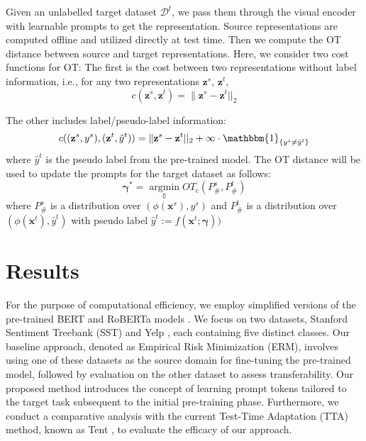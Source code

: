 \documentclass[11pt,a4paper]{article}
\begin{document}
Given an unlabelled target dataset $\mathcal{D}^t$, we pass them through the visual encoder with learnable prompts to get the representation. 
Source representations are computed offline and utilized directly at test time. 
Then we compute the OT distance between source and target representations. 
Here, we consider two cost functions for OT: The first is the cost between two representations without label information, i.e., for any two representations $\mathbf{z}^s$, $\mathbf{z}^t$, 
\begin{equation}
    c(\mathbf{z}^s, \mathbf{z}^t) = \|\mathbf{z}^s- \mathbf{z}^t||_2
\end{equation}

The other includes label/pseudo-label information:
\begin{equation}
    c((\mathbf{z}^s, y^s), (\mathbf{z}^t, \hat y^t)) = \|\mathbf{z}^s- \mathbf{z}^t||_2 + \infty \cdot \mathbbm{1}_{\{y^s \neq \hat y^t\}}
\end{equation}
where $\hat y^t$ is the pseudo label from the pre-trained model.
The OT distance will be used to update the prompts for the target dataset as follows:
\begin{equation}
\label{eq:ot-vp}
    \mathbf{\gamma}^* = \mathop{\arg \min}\limits_{\mathbb{\gamma}} OT_c(P^s_\#, P^t_\#)
\end{equation}
where $P^s_\#$ is a distribution over $(\phi(\mathbf{x}^s), y^s)$ and $P^t_\#$ is a distribution over $(\phi(\mathbf{x}^t), \hat y^t)$ with pseudo label $\hat y^t := f(\mathbf{x}^t; \mathbf{\gamma}))$


\section{Results}
For the purpose of computational efficiency, we employ simplified versions of the pre-trained BERT and RoBERTa models \cite{sanh2020distilbert}. We focus on two datasets, Stanford Sentiment Treebank (SST) and Yelp \cite{zhang2015character}, each containing five distinct classes. Our baseline approach, denoted as Empirical Risk Minimization (ERM), involves using one of these datasets as the source domain for fine-tuning the pre-trained model, followed by evaluation on the other dataset to assess transferability. Our proposed method introduces the concept of learning prompt tokens tailored to the target task subsequent to the initial pre-training phase. Furthermore, we conduct a comparative analysis with the current Test-Time Adaptation (TTA) method, known as Tent \cite{wang2021tent}, to evaluate the efficacy of our approach.
\end{document}
